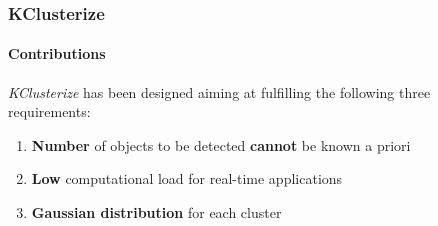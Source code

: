 \begin{frame}
	\frametitle{KClusterize}
	\framesubtitle{Contributions}
	
	\Large
	
	\emph{KClusterize} has been designed aiming at fulfilling the following three requirements:
	
	\begin{enumerate}
		\item \textbf{Number} of objects to be detected \textbf{cannot} be known a priori
		\item \textbf{Low} computational load for real-time applications
		\item \textbf{Gaussian distribution} for each cluster
	\end{enumerate}
\end{frame}

